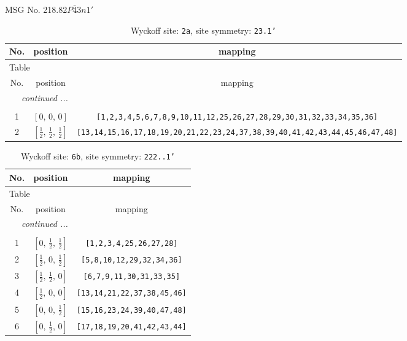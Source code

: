 \documentclass[fleqn,8pt]{jsarticle}
\begin{document}
\setcounter{MaxMatrixCols}{32}

\renewcommand{\tablename}{Table~}
\renewcommand{\figurename}{Figure~}
\begin{center}
\LARGE
MSG No. 218.82\quad$P\bar{4}3n1'$
\end{center}
\renewcommand{\arraystretch}{1.2}
\begin{longtable}{ccc}
\caption{Wyckoff site: {\tt 2a}, site symmetry: {\tt 23.1'}}
 \\
 \hline \hline
No. & position & mapping \\ \hline \endfirsthead

\multicolumn{2}{l}{\tablename\ \thetable{}} \\
 \hline \hline
No. & position & mapping \\ \hline \endhead

 \hline \hline
\multicolumn{2}{r}{\footnotesize\it continued ...} \\ \endfoot

 \hline \hline
\multicolumn{2}{r}{} \\ \endlastfoot

1 & $\left[ 0,\, 0,\, 0 \right]$ & {\tt [1,2,3,4,5,6,7,8,9,10,11,12,25,26,27,28,29,30,31,32,33,34,35,36]} \\ \hline
2 & $\left[ \frac{1}{2},\, \frac{1}{2},\, \frac{1}{2} \right]$ & {\tt [13,14,15,16,17,18,19,20,21,22,23,24,37,38,39,40,41,42,43,44,45,46,47,48]} \\
\end{longtable}
\renewcommand{\arraystretch}{1.2}
\begin{longtable}{ccc}
\caption{Wyckoff site: {\tt 6b}, site symmetry: {\tt 222..1'}}
 \\
 \hline \hline
No. & position & mapping \\ \hline \endfirsthead

\multicolumn{2}{l}{\tablename\ \thetable{}} \\
 \hline \hline
No. & position & mapping \\ \hline \endhead

 \hline \hline
\multicolumn{2}{r}{\footnotesize\it continued ...} \\ \endfoot

 \hline \hline
\multicolumn{2}{r}{} \\ \endlastfoot

1 & $\left[ 0,\, \frac{1}{2},\, \frac{1}{2} \right]$ & {\tt [1,2,3,4,25,26,27,28]} \\ \hline
2 & $\left[ \frac{1}{2},\, 0,\, \frac{1}{2} \right]$ & {\tt [5,8,10,12,29,32,34,36]} \\ \hline
3 & $\left[ \frac{1}{2},\, \frac{1}{2},\, 0 \right]$ & {\tt [6,7,9,11,30,31,33,35]} \\ \hline
4 & $\left[ \frac{1}{2},\, 0,\, 0 \right]$ & {\tt [13,14,21,22,37,38,45,46]} \\ \hline
5 & $\left[ 0,\, 0,\, \frac{1}{2} \right]$ & {\tt [15,16,23,24,39,40,47,48]} \\ \hline
6 & $\left[ 0,\, \frac{1}{2},\, 0 \right]$ & {\tt [17,18,19,20,41,42,43,44]} \\
\end{longtable}
\end{document}
